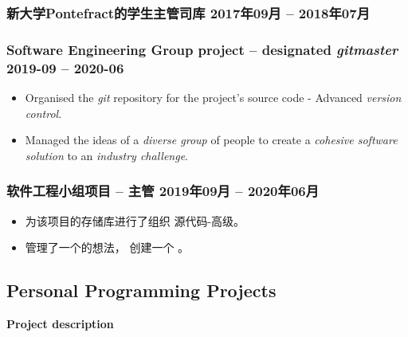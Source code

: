 \documentclass[cv_en.tex]{subfiles}
\begin{document}
\begin{xcn}
        \subsubsection{新大学Pontefract的学生主管司库 %
        \hfill 2017年09月 -- 2018年07月}
\end{xcn}
\begin{xen}
        \subsubsection{Software Engineering Group project -- designated \emph{gitmaster}
        \hfill 2019-09 -- 2020-06}
            \begin{itemize}
                \item Organised the \emph{git} repository for the project's
                    source code - Advanced \emph{version control}.
                \item Managed the ideas of a \emph{diverse group} of people to
                    create a \emph{cohesive software solution} to an
                    \emph{industry challenge}.
            \end{itemize}
\end{xen}
\begin{xcn}
        \subsubsection{软件工程小组项目 -- 主管
        \hfill 2019年09月 -- 2020年06月}
            \begin{itemize}
                \item 为该项目的存储库进行了组织
                    源代码-高级。
                \item 管理了一个的想法，
                    创建一个 。
            \end{itemize}
\end{xcn}
\begin{xen}
    \subsection{Personal Programming Projects}
        \hspace{1em} \textbf{Project description}
\end{xen}
\end{document}
